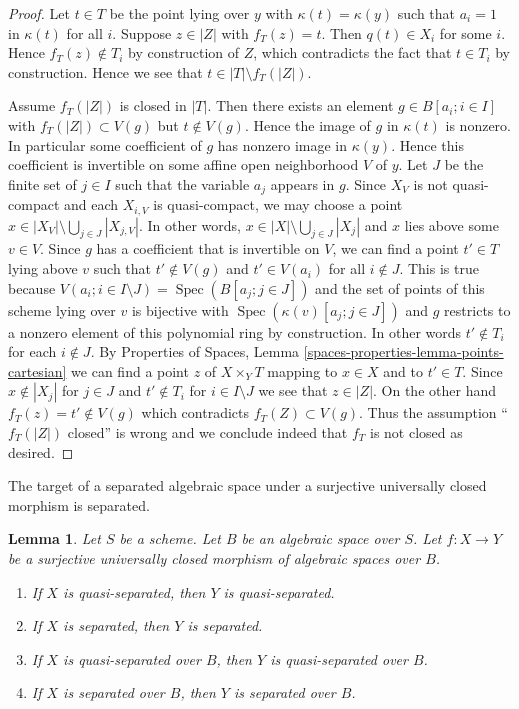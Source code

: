 \documentclass{stacks-project}
\theoremstyle{plain}
\newtheorem{lemma}[subsection]{Lemma}
\theoremstyle{definition}
\theoremstyle{remark}
\numberwithin{equation}{subsection}
\def\Spec{\mathop{\mathrm{Spec}}}
\begin{document}
\begin{proof}
\medskip\noindent
Let $t \in T$ be the point lying over $y$ with $\kappa(t) = \kappa(y)$
such that $a_i = 1$ in $\kappa(t)$ for all $i$. Suppose $z \in |Z|$ with
$f_T(z) = t$. Then $q(t) \in X_i$ for some $i$. Hence $f_T(z) \not \in T_i$
by construction of $Z$, which contradicts the fact that $t \in T_i$ by
construction. Hence we see that $t \in |T| \setminus f_T(|Z|)$.

\medskip\noindent
Assume $f_T(|Z|)$ is closed in $|T|$. Then there exists an element
$g \in B[a_i; i \in I]$ with $f_T(|Z|) \subset V(g)$ but $t \not \in V(g)$.
Hence the image of $g$ in $\kappa(t)$ is nonzero. In particular some
coefficient of $g$ has nonzero image in $\kappa(y)$. Hence this coefficient is
invertible on some affine open neighborhood $V$ of $y$. Let $J$ be the finite
set of $j \in I$ such that the variable $a_j$ appears in $g$.
Since $X_V$ is not quasi-compact and each $X_{i, V}$ is quasi-compact,
we may choose a point $x \in |X_V| \setminus \bigcup_{j \in J} |X_{j, V}|$.
In other words, $x \in |X| \setminus \bigcup_{j \in J} |X_j|$ and $x$ lies
above some $v \in V$. Since $g$ has a coefficient that is invertible on $V$,
we can find a point $t' \in T$ lying above $v$ such that $t' \not \in V(g)$ and
$t' \in V(a_i)$ for all $i \notin J$. This is true because
$V(a_i; i \in I \setminus J) = \Spec(B[a_j; j\in J])$
and the set of points of this scheme lying over $v$ is bijective
with $\Spec(\kappa(v)[a_j; j \in J])$ and $g$ restricts to
a nonzero element of this polynomial ring by construction.
In other words $t' \not \in T_i$ for each $i \not \in J$. By
Properties of Spaces, Lemma \ref{spaces-properties-lemma-points-cartesian}
we can find a point $z$ of $X \times_Y T$ mapping to $x \in X$ and to
$t' \in T$. Since $x \not \in |X_j|$ for $j \in J$ and $t' \not \in T_i$
for $i \in I \setminus J$ we see that $z \in |Z|$. On the other hand
$f_T(z) = t' \not \in V(g)$ which contradicts $f_T(Z) \subset V(g)$.
Thus the assumption ``$f_T(|Z|)$ closed'' is wrong and we conclude indeed
that $f_T$ is not closed as desired.
\end{proof}

\noindent
The target of a separated algebraic space under a surjective
universally closed morphism is separated.

\begin{lemma}
\label{lemma-image-universally-closed-separated}
Let $S$ be a scheme. Let $B$ be an algebraic space over $S$.
Let $f : X \to Y$ be a surjective universally closed
morphism of algebraic spaces over $B$.
\begin{enumerate}
\item If $X$ is quasi-separated, then $Y$ is quasi-separated.
\item If $X$ is separated, then $Y$ is separated.
\item If $X$ is quasi-separated over $B$, then $Y$ is quasi-separated over $B$.
\item If $X$ is separated over $B$, then $Y$ is separated over $B$.
\end{enumerate}
\end{lemma}
\end{document}

